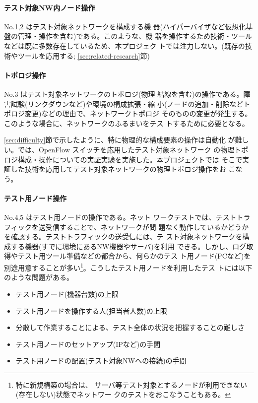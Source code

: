     \paragraph{テスト対象NW内ノード操作}
 No.1,2 はテスト対象ネットワークを構成する機
器(ハイパーバイザなど仮想化基盤の管理・操作を含む)である。このような、機
器を操作するため技術・ツールなどは既に多数存在しているため、本プロジェク
トでは注力しない。(既存の技術やツールを応用する;
\ref{sec:related-research}節)

    \paragraph{トポロジ操作}
 No.3 はテスト対象ネットワークのトポロジ(物理
結線を含む)の操作である。障害試験(リンクダウンなど)や環境の構成拡張・縮
小(ノードの追加・削除などトポロジ変更)などの理由で、ネットワークトポロジ
そのものの変更が発生する。このような場合に、ネットワークのふるまいをテス
トするために必要となる。

\ref{sec:difficulty}節で示したように、特に物理的な構成要素の操作は自動化
が難しい。\lopj では、OpenFlow スイッチを応用したテスト対象ネットワーク
の物理トポロジ構成・操作についての実証実験を実施した。本プロジェクトでは
そこで実証した技術を応用してテスト対象ネットワークの物理トポロジ操作をお
こなう。

    \paragraph{テスト用ノード操作}
 No.4,5 はテスト用ノードの操作である。ネット
ワークテストでは、テストトラフィックを送受信することで、ネットワークが問
題なく動作しているかどうかを確認する。テストトラフィックの送受信には、テ
スト対象ネットワークを構成する機器(すでに環境にあるNW機器やサーバ)を利用
できる。しかし、ログ取得やテスト用ツール準備などの都合から、何らかのテス
ト用ノード(PCなど)を別途用意することが多い\footnote{特に新規構築の場合は、
サーバ等テスト対象とするノードが利用できない(存在しない)状態でネットワー
クのテストをおこなうこともある。}。こうしたテスト用ノードを利用したテス
トには以下のような問題がある。
\begin{itemize}
 \item テスト用ノード(機器台数)の上限
 \item テスト用ノードを操作する人(担当者人数)の上限
 \item 分散して作業することによる、テスト全体の状況を把握することの難しさ
 \item テスト用ノードのセットアップ(IPなど)の手間
 \item テスト用ノードの配置(テスト対象NWへの接続)の手間
\end{itemize}

